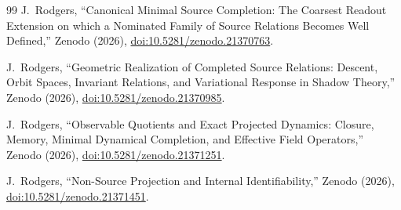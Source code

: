 \documentclass[11pt,a4paper]{article}
\theoremstyle{plain}
\theoremstyle{definition}
\begin{document}
\begin{thebibliography}{99}
J.~Rodgers,
``Canonical Minimal Source Completion: The Coarsest Readout Extension on which a Nominated Family of Source Relations Becomes Well Defined,''
Zenodo (2026),
\href{https://doi.org/10.5281/zenodo.21370763}{doi:10.5281/zenodo.21370763}.

J.~Rodgers,
``Geometric Realization of Completed Source Relations: Descent, Orbit Spaces, Invariant Relations, and Variational Response in Shadow Theory,''
Zenodo (2026),
\href{https://doi.org/10.5281/zenodo.21370985}{doi:10.5281/zenodo.21370985}.

J.~Rodgers,
``Observable Quotients and Exact Projected Dynamics: Closure, Memory, Minimal Dynamical Completion, and Effective Field Operators,''
Zenodo (2026),
\href{https://doi.org/10.5281/zenodo.21371251}{doi:10.5281/zenodo.21371251}.

J.~Rodgers,
``Non-Source Projection and Internal Identifiability,''
Zenodo (2026),
\href{https://doi.org/10.5281/zenodo.21371451}{doi:10.5281/zenodo.21371451}.

\end{thebibliography}
\end{document}
